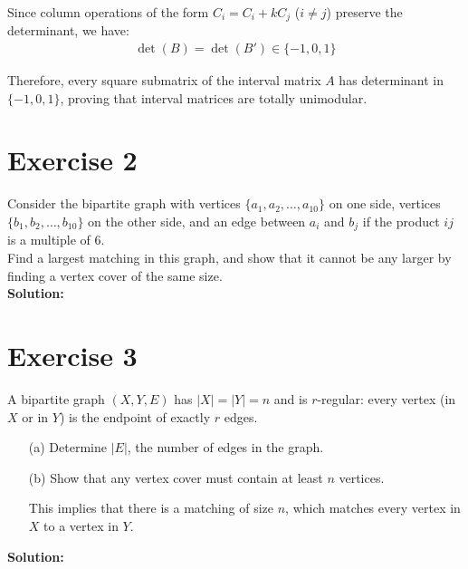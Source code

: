 \documentclass{article}
\begin{document}
Since column operations of the form $C_i = C_i + kC_j$ ($i \neq j$) preserve the determinant, we have:
\begin{align*}
\det(B) = \det(B') \in \{-1, 0, 1\}
\end{align*}

Therefore, every square submatrix of the interval matrix $A$ has determinant in $\{-1, 0, 1\}$, proving that interval matrices are totally unimodular.

\newpage

\section*{Exercise 2}
Consider the bipartite graph with vertices $\{a_1, a_2, \ldots, a_{10}\}$ on one side, vertices $\{b_1, b_2, \ldots, b_{10}\}$ on the other side, and an edge between $a_i$ and $b_j$ if the product $ij$ is a multiple of 6. \\

Find a largest matching in this graph, and show that it cannot be any larger by finding a vertex cover of the same size. \\

\textbf{Solution:} \\



\newpage

\section*{Exercise 3}
A bipartite graph $(X,Y,E)$ has $|X| = |Y| = n$ and is $r$-regular: every vertex (in $X$ or in $Y$) is the endpoint of exactly $r$ edges.

\begin{itemize}
    \item[(a)] Determine $|E|$, the number of edges in the graph.
    \item[(b)] Show that any vertex cover must contain at least $n$ vertices.
    
    This implies that there is a matching of size $n$, which matches every vertex in $X$ to a vertex in $Y$.
\end{itemize}

\textbf{Solution:} \\
\end{document}
